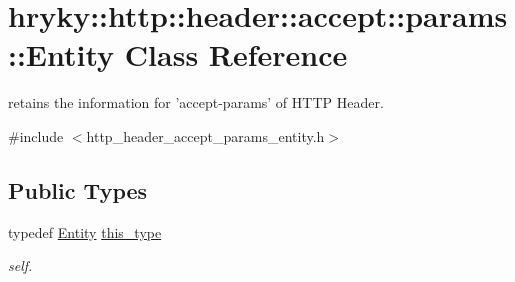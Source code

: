 \hypertarget{classhryky_1_1http_1_1header_1_1accept_1_1params_1_1_entity}{\section{hryky\-:\-:http\-:\-:header\-:\-:accept\-:\-:params\-:\-:Entity Class Reference}
\label{classhryky_1_1http_1_1header_1_1accept_1_1params_1_1_entity}
}


retains the information for 'accept-\/params' of H\-T\-T\-P Header.  




{\ttfamily \#include $<$http\-\_\-header\-\_\-accept\-\_\-params\-\_\-entity.\-h$>$}

\subsection*{Public Types}
\begin{DoxyCompactItemize}
\item 
\hypertarget{classhryky_1_1http_1_1header_1_1accept_1_1params_1_1_entity_a1d1bd4e3329e61ed7ad02693efc341b9}{typedef \hyperlink{classhryky_1_1http_1_1header_1_1accept_1_1params_1_1_entity}{Entity} \hyperlink{classhryky_1_1http_1_1header_1_1accept_1_1params_1_1_entity_a1d1bd4e3329e61ed7ad02693efc341b9}{this\-\_\-type}}\label{classhryky_1_1http_1_1header_1_1accept_1_1params_1_1_entity_a1d1bd4e3329e61ed7ad02693efc341b9}

\begin{DoxyCompactList}\small\item\em self. \end{DoxyCompactList}\end{DoxyCompactItemize}
